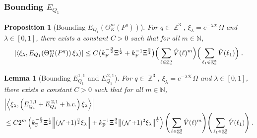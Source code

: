 \documentclass[12pt,a4paper]{article}
\numberwithin{equation}{section}
\newcommand{\cK}{\mathcal{K}}
\newcommand{\NNN}{\mathbb{N}}
\newcommand{\1}{\mathbb{I}}
\newcommand{\F}{\mathrm{F}}
\DeclareMathOperator{\Z}{\mathbb{Z}}
\DeclareMathOperator{\NN}{\mathcal{N}}
\newcommand{\half}{\frac{1}{2}}
\newcommand{\eva}[1]{\left\langle #1 \right\rangle}
\theoremstyle{plain}
\newtheorem{lemma}[theorem]{Lemma}
\newtheorem{proposition}[theorem]{Proposition}
\theoremstyle{definition}
\theoremstyle{remark}
\theoremstyle{plain}
\theoremstyle{definition}
\theoremstyle{remark}
\begin{document}
\subsubsection{Bounding $E_{Q_1}$}

\begin{proposition}[Bounding $E_{Q_1}(\Theta^m_{K}(P^q))$]\label{prop:finEQ1est}
For $ q \in \Z^3 $, $\xi_\lambda = e^{-\lambda \cK} \Omega$ and $ \lambda \in [0,1] $, there exists a constant $ C > 0 $ such that for all $ m \in \NNN $,
\begin{equation} \label{eq:finalEQ1est}
	\abs{\eva{\xi_\lambda, E_{Q_1}\!\left(\Theta^m_K(P^q)\right) \xi_\lambda}}
	\leq C \big( k_{\F}^{-\frac{3}{2}} \Xi^\half + k_{\F}^{-1}\Xi^{\frac{3}{4}} \big)
		\Big(\sum\limits_{\ell \in \Z^3_*} \hat{V}(\ell)^m\Big)
		\Big( \sum\limits_{\ell_1 \in \Z^3_*} \hat{V}(\ell_1) \Big) \;.
\end{equation}
\end{proposition}





\begin{lemma}[Bounding $E_{Q_1}^{1,1}$ and $E^{\,2,1}_{Q_1}$]\label{lem:EQ111}
For $ q \in \Z^3 $, $\xi_\lambda = e^{-\lambda \cK} \Omega$ and $ \lambda \in [0,1] $, there exists a constant $ C > 0 $ such that for all $ m \in \NNN $,
\begin{equation} \label{eq:estEQ111}
\begin{aligned}
	&\abs{\eva{\xi_\lambda,\left(E^{\,1,1}_{Q_1}+E^{\,2,1}_{Q_1}+\mathrm{h.c.}\right) \xi_\lambda }} \\
	&\leq C 2^m \left(
		k_{\F}^{-\frac{3}{2}} \Xi^\half \norm{ (\NN+1)^{\frac{3}{2}} \xi_\lambda }
		 + k_{\F}^{-1}\Xi^{\frac{3}{4}} \norm{ (\NN+1)^2\xi_\lambda}^\half \right) 
		\Bigg(\sum\limits_{\ell \in \Z^3_*} \hat{V}(\ell)^m\Bigg)\Bigg( \sum\limits_{\ell_1 \in \Z^3_*} \hat{V}(\ell_1) \Bigg) \;.
\end{aligned}
\end{equation}
\end{lemma}
\end{document}
